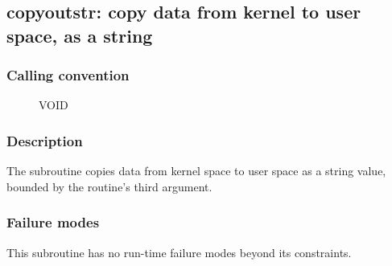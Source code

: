 \clearpage
{}
{}
\label{subr:copyoutstr}
\subsection*{copyoutstr: copy data from kernel to user space, as a string}

\subsubsection*{Calling convention}

\begin{description}
\item[] VOID
\end{description}

\subsubsection*{Description}

The  subroutine copies data from kernel space
to user space as a string value, bounded by the routine's third argument.

\subsubsection*{Failure modes}

This subroutine has no run-time failure modes beyond its constraints.
